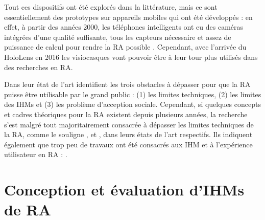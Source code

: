 



Tout ces dispositifs ont été explorés dans la littérature, mais ce sont essentiellement des prototypes sur appareils mobiles qui ont été développés : en effet, à partir des années 2000, les téléphones intelligents ont eu des caméras intégrées d'une qualité suffisante, tous les capteurs nécessaire et assez de puissance de calcul pour rendre la RA possible \citep{Huang2013}. Cependant, avec l'arrivée du HoloLens en 2016 les visiocasques vont pouvoir être à leur tour plus utilisés dans des recherches en RA.

Dans leur état de l'art \cite{Azuma2001} identifient les trois obstacles à dépasser pour que la RA puisse être utilisable par le grand public : (1) les limites techniques, (2) les limites des IHMs et (3) les problème d'acception sociale. Cependant, si quelques concepts et cadres théoriques pour la RA existent depuis plusieurs années, la recherche s'est malgré tout majoritairement consacrée à dépasser les limites techniques de la RA, comme le souligne \cite{Zhou2008}, \cite{VanKrevelen2010} et \cite{Billinghurst2015}, dans leurs états de l'art respectifs. Ils indiquent également que trop peu de travaux ont été consacrés aux IHM et à l'expérience utilisateur en RA :  \citep{Billinghurst2015}.


\section{Conception et évaluation d'IHMs de RA}
\label{sec:litterature_ar_hci}

